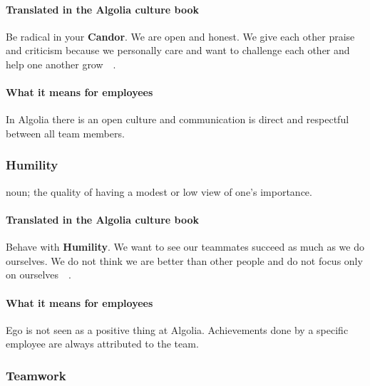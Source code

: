 \paragraph{Translated in the Algolia culture book}

Be radical in your \textbf{Candor}. We are open and honest. We give each other praise and criticism because we personally care and want to challenge each other and help one another grow~\cite{algolia-careers}~.

\paragraph{What it means for employees} 

In Algolia there is an open culture and communication is direct and respectful between all team members. %

\subsubsection{Humility}
\label{ssub:humility}

\begin{definition}
noun; the quality of having a modest or low view of one's importance.
\end{definition}


\paragraph{Translated in the Algolia culture book}

Behave with \textbf{Humility}. We want to see our teammates succeed as much as we do ourselves. We do not think we are better than other people and do not focus only on ourselves~\cite{algolia-careers}~.

\paragraph{What it means for employees} 

Ego is not seen as a positive thing at Algolia. Achievements done by a specific employee are always attributed to the team.


\subsubsection{Teamwork}

